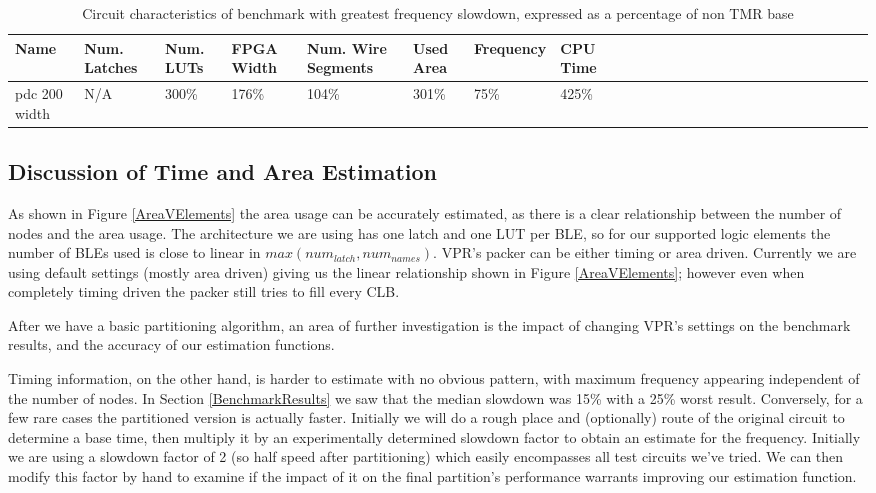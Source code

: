 \documentclass[12pt,final,oneside]{dwThesis} %
\begin{document}
   \begin{table}
      \begin{adjustwidth}{-1cm}{-1cm}
         \begin{tabularx}{1.1\textwidth}{XXXXXXXXXXXXXXXXXXXXXXXXXX}
            \toprule
            Name & Num. Latches & Num. \acp{LUT} & FPGA Width & Num. Wire Segments & Used Area & Frequency & CPU Time\\
            \midrule
            pdc 200 width   & N/A   & 300\% & 176\% & 104\% & 301\% &  75\% & 425\%\\
            \bottomrule
         \end{tabularx}
         \caption{Circuit characteristics of benchmark with greatest frequency slowdown, expressed as a percentage of non \ac{TMR} base}
         \label{timing2}
      \end{adjustwidth}
   \end{table}
   \subsection{Discussion of Time and Area Estimation}
   As shown in Figure \ref{AreaVElements} the area usage can be accurately estimated, as there is a clear relationship between the number of nodes and the area usage. The architecture we are using has one latch and one \ac{LUT} per \ac{BLE}, so for our supported logic elements the number of \acp{BLE} used is close to linear in $max(num_{latch}, num_{names})$. \ac{VPR}'s packer can be either timing or area driven. Currently we are using default settings (mostly area driven) giving us the linear relationship shown in Figure \ref{AreaVElements}; however even when completely timing driven the packer still tries to fill every \ac{CLB}\cite{AAPackThesis}.

   After we have a basic partitioning algorithm, an area of further investigation is the impact of changing \ac{VPR}'s settings on the benchmark results, and the accuracy of our estimation functions.

   Timing information, on the other hand, is harder to estimate with no obvious pattern, with maximum frequency appearing independent of the number of nodes. In Section \ref{BenchmarkResults} we saw that the median slowdown was 15\% with a 25\% worst result. Conversely, for a few rare cases the partitioned version is actually faster. Initially we will do a rough place and (optionally) route of the original circuit to determine a base time, then multiply it by an experimentally determined slowdown factor to obtain an estimate for the frequency. Initially we are using a slowdown factor of 2 (so half speed after partitioning) which easily encompasses all test circuits we've tried. We can then modify this factor by hand to examine if the impact of it on the final partition's performance warrants improving our estimation function.
\end{document}
